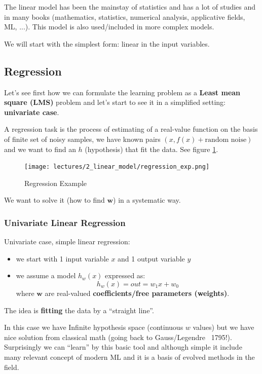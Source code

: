 \documentclass[../main.tex]{subfiles}
\begin{document}
The linear model has been the mainstay of statistics and has a lot of studies and in many books (mathematics, statistics, numerical analysis, applicative fields, ML, ...). This model is also used/included in more complex models.

We will start with the simplest form: linear in the input variables.

\subsection{Regression}
Let's see first how we can formulate the learning problem as a \textbf{Least mean square (LMS)} problem and let's start to see it in a simplified setting: \textbf{univariate case}.

A regression task is the process of estimating of a real-value function on the basis of finite set of noisy samples, we have known pairs $(x, f(x) + \text{random noise})$ and we want to find an $h$ (hypothesis) that fit the data. See figure \ref{fig:linear_model_regression_exp}.
\begin{figure}
    \centering
    \texttt{[image: lectures/2\_linear\_model/regression\_exp.png]}
    \caption{Regression Example}
    \label{fig:linear_model_regression_exp}
\end{figure}

We want to solve it (how to find $\mathbf{w}$) in a systematic way.

\subsubsection{Univariate Linear Regression}

Univariate case, simple linear regression:
\begin{itemize}
    \item we start with 1 input variable $x$ and 1 output variable $y$
    
    \item we assume a model $h_w(x)$ expressed as:
    $$ h_w(x) = out = w_1x + w_0$$
    where $\mathbf{w}$ are real-valued \textbf{coefficients/free parameters (weights)}.
\end{itemize}

\begin{center}
    The idea is \textbf{fitting} the data by a  “straight line”.
\end{center}

In this case we have Infinite hypothesis space (continuous $w$ values) but we have nice solution from classical math (going back to Gauss/Legendre ~1795!).\\
Surprisingly we can “learn” by this basic tool and although simple it include many relevant concept of modern ML and it is
a basis of evolved methods in the field.
\end{document}
